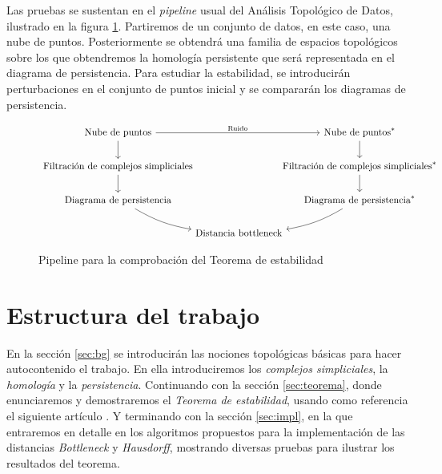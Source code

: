 Las pruebas se sustentan en el \emph{pipeline} usual del Análisis Topológico de Datos, ilustrado en la figura \ref{ref:pipeline}. Partiremos de un conjunto de datos, en este caso, una nube de puntos. Posteriormente se obtendrá una familia de espacios topológicos sobre los que obtendremos la homología persistente que será representada en el diagrama de persistencia. Para estudiar la estabilidad, se introducirán perturbaciones en el conjunto de puntos inicial y se compararán los diagramas de persistencia.

\begin{figure}[ht]
\[
\begin{tikzcd}[
  column sep={125pt,between origins}
]
\text{Nube de puntos} \arrow[d] \arrow[rr, "\text{Ruido}"] &                             & \text{Nube de puntos}^* \arrow[d]                       \\
\text{Filtración de complejos simpliciales} \arrow[d]      & 
& \text{Filtración de complejos simpliciales}^* \arrow[d] \\
\text{Diagrama de persistencia} \arrow[rd, bend right=10]                 &                             & \text{Diagrama de persistencia}^* \arrow[ld,bend left=10]            \\
&\text{Distancia bottleneck} &
\end{tikzcd}
\]
\caption{Pipeline para la comprobación del Teorema de estabilidad}
\label{ref:pipeline}
\end{figure}

\section{Estructura del trabajo}
En la sección \ref{sec:bg} se introducirán las nociones topológicas básicas para hacer autocontenido el trabajo. En ella introduciremos los \emph{complejos simpliciales}, la \emph{homología} y la \emph{persistencia}. Continuando con la sección \ref{sec:teorema}, donde enunciaremos y demostraremos el \emph{Teorema de estabilidad}, usando como referencia el siguiente artículo \cite{Cohen-Steiner2007}. Y terminando con la sección \ref{sec:impl}, en la que entraremos en detalle en los algoritmos propuestos para la implementación de las distancias \emph{Bottleneck} y \emph{Hausdorff}, mostrando diversas pruebas para ilustrar los resultados del teorema.
